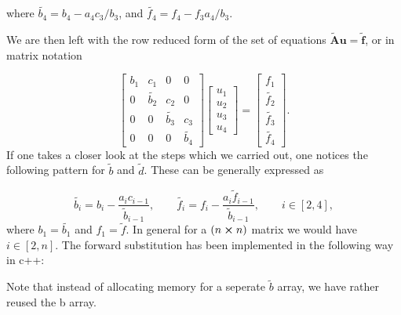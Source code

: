 \documentclass[a4paper,10pt]{article}
\begin{document}
where $\tilde{b_4} = b_4 - a_4c_3/b_3$, and $\tilde{f_4} = f_4 - f_3a_4/b_3$. 

\newpage

We are then left with the row reduced form of the set of equations $\tilde{\mathbf{A}}\mathbf{u} = \tilde{\mathbf{f}}$, or in matrix notation

\begin{equation}
\begin{bmatrix}
b_1 & c_1 & 0 & 0 \\
0& \tilde{b_2}  & c_2 & 0 \\
0 & 0 & \tilde{b_3} & c_3 \\
0 & 0 & 0 & \tilde{b_4} 
\end{bmatrix} \begin{bmatrix}
u_1\\
u_2\\
u_3\\
u_4
\end{bmatrix} = \begin{bmatrix}
f_1\\
\tilde{f_2}\\
\tilde{f_3}\\
\tilde{f_4}
\end{bmatrix}.
\end{equation}
If one takes a closer look at the steps which we carried out, one notices the following pattern for $\tilde{b}$ and $\tilde{d}$. These can be generally expressed as

\begin{equation}
\tilde{b_i} = b_i - \frac{a_i c_{i-1}}{\tilde{b}_{i-1}}, \qquad 
\tilde{f_i} = f_i - \frac{a_i \tilde{f}_{i-1}}{\tilde{b}_{i-1}}, \qquad i \in [2,4],
\end{equation}
where $b_1 = \tilde{b_1}$ and $f_1 = \tilde{f}$. In general for a $(n \cross n)$ matrix we would have $i \in [2,n]$. The forward substitution has been implemented in the following way in c++:


Note that instead of allocating memory for a seperate $\tilde{b}$ array, we have rather reused the b array.
\end{document}
